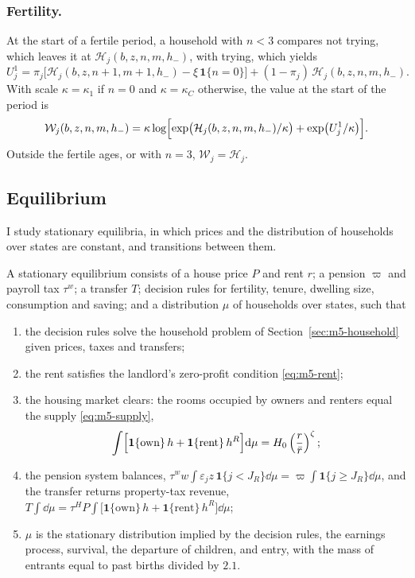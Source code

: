 \subsubsection*{Fertility.}
At the start of a fertile period, a household with $n<3$ compares not trying,
which leaves it at $\mathcal H_j(b,z,n,m,h_-)$, with trying, which yields
\[
 U^1_j=\pi_j\bigl[\mathcal H_j(b,z,n+1,m+1,h_-)-\xi\,\mathbf 1\{n=0\}\bigr]
 +(1-\pi_j)\,\mathcal H_j(b,z,n,m,h_-).
\]
With scale $\kappa=\kappa_1$ if $n=0$ and $\kappa=\kappa_C$ otherwise, the
value at the start of the period is
\begin{equation}
 \mathcal W_j(b,z,n,m,h_-)=\kappa\log\Bigl[\exp\bigl(\mathcal H_j(b,z,n,m,h_-)/\kappa\bigr)
 +\exp\bigl(U^1_j/\kappa\bigr)\Bigr].
 \label{eq:m5-fertility}
\end{equation}
Outside the fertile ages, or with $n=3$, $\mathcal W_j=\mathcal H_j$.

\subsection{Equilibrium}

I study stationary equilibria, in which prices and the distribution of
households over states are constant, and transitions between them.

\begin{definition}
A stationary equilibrium consists of a house price $P$ and rent $r$; a pension
$\varpi$ and payroll tax $\tau^w$; a transfer $T$; decision rules for
fertility, tenure, dwelling size, consumption and saving; and a distribution
$\mu$ of households over states, such that
\begin{enumerate}
\item the decision rules solve the household problem of Section~\ref{sec:m5-household} given
prices, taxes and transfers;
\item the rent satisfies the landlord's zero-profit condition
\eqref{eq:m5-rent};
\item the housing market clears: the rooms occupied by owners and renters
equal the supply \eqref{eq:m5-supply},
\[
 \int\Bigl[\mathbf 1\{\text{own}\}\,h+\mathbf 1\{\text{rent}\}\,h^R\Bigr]\mathrm d\mu
 =H_0\left(\frac{r}{\bar r}\right)^{\zeta};
\]
\item the pension system balances, $\tau^w w\int\varepsilon_j z\,
\mathbf 1\{j<J_R\}\dd\mu=\varpi\int\mathbf 1\{j\geq J_R\}\dd\mu$, and the
transfer returns property-tax revenue, $T\int\dd\mu=\tau^H P\int\bigl[
\mathbf 1\{\text{own}\}\,h+\mathbf 1\{\text{rent}\}\,h^R\bigr]\dd\mu$;
\item $\mu$ is the stationary distribution implied by the decision rules, the
earnings process, survival, the departure of children, and entry, with the
mass of entrants equal to past births divided by $2.1$.
\end{enumerate}
\end{definition}

